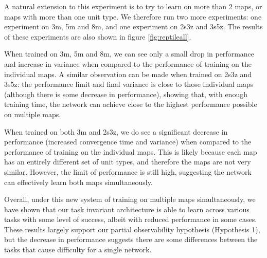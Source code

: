 A natural extension to this experiment is to try to learn on more than 2 maps, or maps with more than one unit type. We therefore run two more experiments: one experiment on 3m, 5m and 8m, and one experiment on 2s3z and 3s5z. The results of these experiments are also shown in figure \ref{fig:reptileall}.



When trained on 3m, 5m and 8m, we can see only a small drop in performance and increase in variance when compared to the performance of training on the individual maps. A similar observation can be made when trained on 2s3z and 3s5z: the performance limit and final variance is close to those individual maps (although there is some decrease in performance), showing that, with enough training time, the network can achieve close to the highest performance possible on multiple maps.

When trained on both 3m and 2s3z, we do see a significant decrease in performance (increased convergence time and variance) when compared to the performance of training on the individual maps. This is likely because each map has an entirely different set of unit types, and therefore the maps are not very similar. However, the limit of performance is still high, suggesting the network can effectively learn both maps simultaneously.

Overall, under this new system of training on multiple maps simultaneously, we have shown that our task invariant architecture is able to learn across various tasks with some level of success, albeit with reduced performance in some cases. These results largely support our partial observability hypothesis (Hypothesis 1), but the decrease in performance suggests there are some differences between the tasks that cause difficulty for a single network.
